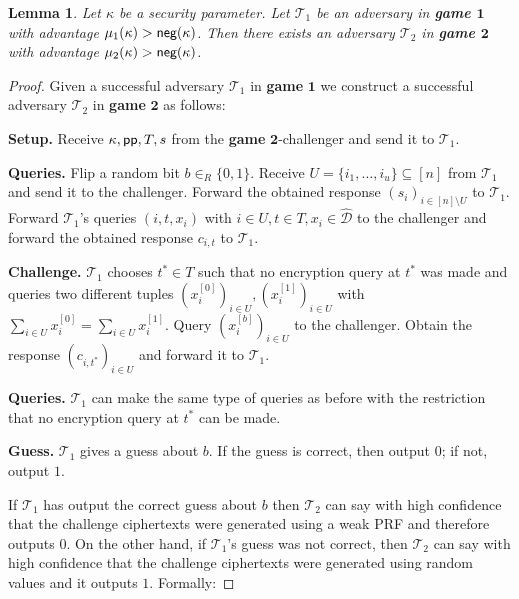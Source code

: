 \documentclass[10pt]{extarticle}
\newtheorem{Lem}[Thm]{Lemma}
\begin{document}
\begin{Lem}\label{gameonetwo} Let $\kappa$ be a security parameter. Let $\mathcal{T}_1$ be an adversary in \textbf{\upshape game $\boldsymbol 1$} with advantage $\mu_{1}(\kappa)>\text{\upshape\sffamily neg}(\kappa)$. Then there exists an adversary $\mathcal{T}_2$ in \textbf{\upshape game $\boldsymbol 2$} with advantage $\mu_{2}(\kappa)>\text{\upshape\sffamily neg}(\kappa)$.
\end{Lem}
\begin{proof} Given a successful adversary $\mathcal{T}_1$ in \textbf{game} $\boldsymbol 1$ we construct a successful adversary $\mathcal{T}_2$ in \textbf{game} $\boldsymbol 2$ as follows:
\noindent\begin{description}
 \item\textbf{Setup.} Receive $\kappa, \mbox{\upshape\sffamily pp},T,s$ from the \textbf{game} $\boldsymbol 2$-challenger and send it to $\mathcal{T}_1$.
\item\textbf{Queries.} Flip a random bit $b\in_R\{0,1\}$. Receive $U=\{i_1,\ldots,i_u\}\subseteq[n]$ from $\mathcal{T}_1$ and send it to the challenger. Forward the obtained response $(s_i)_{i\in[n]\setminus U}$ to $\mathcal{T}_1$. Forward $\mathcal{T}_1$'s queries $(i,t,x_i)$ with $i\in U, t\in T, x_i\in\widehat{\mathcal{D}}$ to the challenger and forward the obtained response $c_{i,t}$ to $\mathcal{T}_1$.
\item\textbf{Challenge.} $\mathcal{T}_1$ chooses $t^*\in T$ such that no encryption query at $t^*$ was made and queries two different tuples $(x_i^{[0]})_{i\in U},(x_i^{[1]})_{i\in U}$ with $\sum_{i\in U}x_i^{[0]}=\sum_{i\in U}x_i^{[1]}$. Query $(x_i^{[b]})_{i\in U}$ to the challenger. Obtain the response $(c_{i,t^*})_{i\in U}$ and forward it to $\mathcal{T}_1$. 
\item\textbf{Queries.} $\mathcal{T}_1$ can make the same type of queries as before with the restriction that no encryption query at $t^*$ can be made.
\item\textbf{Guess.} $\mathcal{T}_1$ gives a guess about $b$. If the guess is correct, then output $0$; if not, output $1$.
\end{description}
If $\mathcal{T}_1$ has output the correct guess about $b$ then $\mathcal{T}_2$ can say with high confidence that the challenge ciphertexts were generated using a weak PRF and therefore outputs $0$. On the other hand, if $\mathcal{T}_1$'s guess was not correct, then $\mathcal{T}_2$ can say with high confidence that the challenge ciphertexts were generated using random values and it outputs $1$. Formally:\par\medskip


\end{proof}
\end{document}
